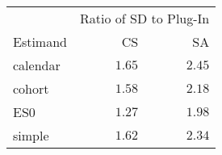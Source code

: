 \captionsetup[table]{labelformat=empty,skip=1pt}
\begin{longtable}{lrr}
\toprule
 & \multicolumn{2}{c}{Ratio of SD to Plug-In} \\ 
 \cmidrule(lr){2-3}
Estimand & CS & SA \\ 
\midrule
calendar & $1.65$ & $2.45$ \\ 
cohort & $1.58$ & $2.18$ \\ 
ES0 & $1.27$ & $1.98$ \\ 
simple & $1.62$ & $2.34$ \\ 
 \bottomrule
\end{longtable}

